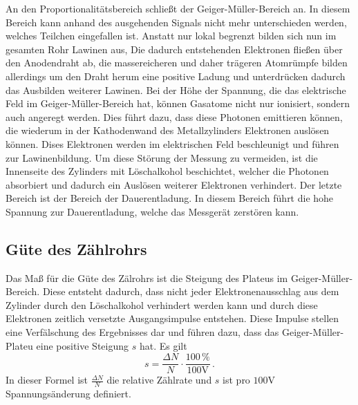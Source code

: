 An den Proportionalitätsbereich schließt der Geiger-Müller-Bereich an. In diesem Bereich 
kann anhand des ausgehenden Signals nicht mehr unterschieden werden, welches Teilchen 
eingefallen ist. Anstatt nur lokal begrenzt bilden sich nun im gesamten Rohr Lawinen aus, 
Die dadurch entstehenden Elektronen fließen über den Anodendraht ab, die massereicheren und daher 
trägeren Atomrümpfe bilden allerdings um den Draht herum eine positive Ladung und unterdrücken
dadurch das Ausbilden weiterer Lawinen. Bei der Höhe der Spannung, die das elektrische 
Feld im Geiger-Müller-Bereich hat, können Gasatome nicht nur ionisiert, sondern auch 
angeregt werden. Dies führt dazu, dass diese Photonen emittieren können, die wiederum in 
der Kathodenwand des Metallzylinders Elektronen auslösen können. Dises Elektronen werden
im elektrischen Feld beschleunigt und führen zur Lawinenbildung. Um diese Störung der
Messung zu vermeiden, ist die Innenseite des Zylinders mit Löschalkohol beschichtet, welcher
die Photonen absorbiert und dadurch ein Auslösen weiterer Elektronen verhindert. Der 
letzte Bereich ist der Bereich der Dauerentladung. In diesem Bereich führt die hohe Spannung
zur Dauerentladung, welche das Messgerät zerstören kann.  

\subsection{Güte des Zählrohrs}
Das Maß für die Güte des Zälrohrs ist die Steigung des Plateus im Geiger-Müller-Bereich. 
Diese entsteht dadurch, dass nicht jeder Elektronenausschlag aus dem Zylinder durch den 
Löschalkohol verhindert werden kann und durch diese Elektronen zeitlich versetzte 
Ausgangsimpulse entstehen. Diese Impulse stellen eine Verfälschung des Ergebnisses dar und 
führen dazu, dass das Geiger-Müller-Plateu eine positive Steigung $s$ hat. Es gilt 
\begin{equation}
    s = \frac{\Delta N}{N} \cdot \frac{100 \,\%}{100 \unit{\volt}} \, .
\end{equation}
In dieser Formel ist $\frac{\Delta N}{N}$ die relative Zählrate und $s$ ist pro 
$100 \unit{\volt}$ Spannungsänderung definiert. 

